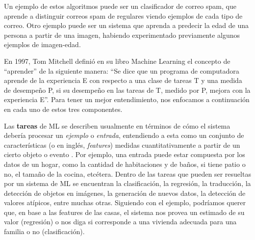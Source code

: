 \documentclass[../../main.tex]{subfiles}
\begin{document}
Un ejemplo de estos algoritmos puede ser un clasificador de correo spam, que aprende a
distinguir correos spam de regulares viendo ejemplos de cada tipo de correo. Otro ejemplo
puede ser un sistema que aprenda a predecir la edad de una persona a partir de una imagen,
habiendo experimentado previamente algunos ejemplos de imagen-edad.

En 1997, Tom Mitchell definió en su libro Machine Learning \cite{ml-tom-mitchell} el
concepto de ``aprender'' de la siguiente manera: ``Se dice que un programa de computadora
aprende de la experiencia E con respecto a una clase de tareas T y una medida de desempeño
P, si su desempeño en las tareas de T, medido por P, mejora con la experiencia E''. Para
tener un mejor entendimiento, nos enfocamos a continuación en cada uno de estos tres
componentes.

Las \textbf{tareas} de ML se describen usualmente en términos de cómo el sistema debería
procesar un \textit{ejemplo} o \textit{entrada}, entendiendo a esta como un conjunto de
características (o en inglés, \textit{features}) medidas cuantitativamente a partir de un
cierto objeto o evento \cite{deep-learning}. Por ejemplo, una entrada puede estar
compuesta por los datos de un hogar, como la cantidad de habitaciones y de baños, si tiene
patio o no, el tamaño de la cocina, etcétera. Dentro de las tareas que pueden ser
resueltas por un sistema de ML se encuentran la clasificación, la regresión, la
traducción, la detección de objetos en imágenes, la generación de nuevos datos, la
detección de valores atípicos, entre muchas otras. Siguiendo con el ejemplo, podríamos
querer que, en base a las features de las casas, el sistema nos provea un estimado de su
valor (regresión) o nos diga si corresponde a una vivienda adecuada para una familia o no
(clasificación).
\end{document}
